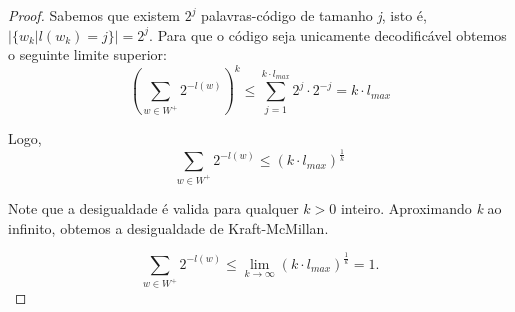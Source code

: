 \begin{lemma}
\begin{proof}
Sabemos que existem $2^{j}$ palavras-código de tamanho \emph{j}, isto é, $|\{w_k | l(w_k) = j\}| = 2^j$. Para que o código seja unicamente decodificável obtemos o seguinte limite superior:
\begin{equation*}
(\sum_{w \in W^+}^{}2^{-l(w)})^k \leq \sum_{j=1}^{k \cdot l_{max}} 2^j \cdot 2^{-j} = k \cdot l_{max}
\end{equation*}

Logo,
\begin{equation*}
\sum_{w \in W^+}^{}2^{-l(w)} \leq (k \cdot l_{max})^ \frac{1}{k}
\end{equation*}

Note que a desigualdade é valida para qualquer $k > 0$ inteiro. Aproximando \emph{k} ao infinito, obtemos a desigualdade de Kraft-McMillan.

\begin{equation*}
\sum_{w \in W^+}^{}2^{-l(w)} \leq \lim_{k\to\infty} (k \cdot l_{max})^ \frac{1}{k} = 1.
\end{equation*}

\end{proof}
\end{lemma}

